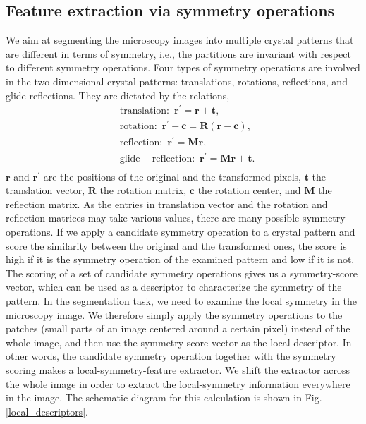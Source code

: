 \documentclass[twocolumn,amsmath, floatfix]{revtex4}
\begin{document}
\subsection{Feature extraction via symmetry operations}
We aim at segmenting the microscopy images into multiple crystal patterns that are different in terms of symmetry, i.e., the partitions are invariant with respect to different symmetry operations.  Four types of symmetry operations are involved in the two-dimensional crystal patterns: translations, rotations, reflections, and glide-reflections. They are dictated by the relations,
\begin{equation}
\begin{aligned}
   & \mathrm{translation : \,\,} \mathbf{r}^\prime = \mathbf{r} + \mathbf{t}, \\
   & \mathrm{rotation: \,\,} \mathbf{r}^\prime-\mathbf{c} = \mathbf{R} (\mathbf{r} -\mathbf{c} ), \\
   & \mathrm{reflection: \,\,} \mathbf{r}^\prime = \mathbf{M}\mathbf{r}, \\
   & \mathrm{glide-reflection: \,\,} \mathbf{r}^\prime = \mathbf{M}\mathbf{r} + \mathbf{t}.\\
\end{aligned}
\end{equation}
$\mathbf{r}$ and $\mathbf{r}^\prime$ are the positions of the original and the transformed pixels,  $\mathbf{t}$ the translation vector, $\mathbf{R}$ the rotation matrix, $\mathbf{c}$ the rotation center, and $\mathbf{M}$ the reflection matrix.
As the entries in translation vector and the rotation and reflection matrices may take various values, there are many possible symmetry operations. 
If we apply a candidate symmetry operation to a crystal pattern and score the similarity between the original and the transformed ones, the score is high if it is the symmetry operation of the examined pattern and low if it is not. The scoring of a set of candidate symmetry operations gives us a symmetry-score vector, which can be used as a descriptor to characterize the symmetry of the pattern. In the segmentation task, we need to examine the local symmetry in the microscopy image. We therefore simply apply the symmetry operations to the patches (small parts of an image centered around a certain pixel) instead of the whole image, and then use the symmetry-score vector as the local descriptor.
In other words, the candidate symmetry operation together with the symmetry scoring makes a local-symmetry-feature extractor.  We shift the extractor across the whole image in order to extract the local-symmetry information everywhere in the image. The schematic diagram for this calculation is shown in Fig. \ref{local_descriptors}. 
\end{document}
